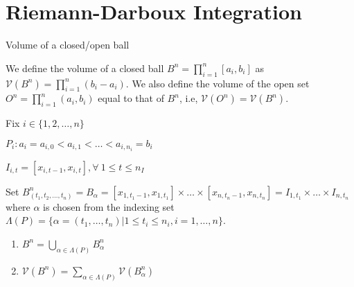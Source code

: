 \documentclass[a4paper]{article}
\begin{document}

\section{Riemann-Darboux Integration}



\begin{Def}{Volume of a closed/open ball}{}

We define the volume of a closed ball $B^n = \prod \limits_{i=1}^n [a_i, b_i]$ as $\mathcal{V}(B^n) = \prod \limits_{i=1}^n (b_i - a_i).$ We also define the volume of the open set $O^n = \prod \limits _{i=1}^n (a_i, b_i)$ equal to that of $B^n$, i.e, $\mathcal{V}(O^n) = \mathcal{V}(B^n)$.

\end{Def}

\begin{notnBox}

Fix $i \in \{1,2, \dots, n\}$ 

$P_i: a_i = a_{i,0} < a_{i,1} < \dots < a_{i,n_i} = b_i$

$I_{i,t} = [x_{i,t-1}, x_{i,t}], \forall \ 1 \leq t \leq n_I$

Set $B_{(t_1,t_2,\dots ,t_n)}^n = B_\alpha = [x_{1,t_1-1}, x_{1,t_1}] \times \dots \times [x_{n,t_n-1}, x_{n,t_n}] = I_{1,t_1} \times \dots \times I_{n,t_n}$ where $\alpha$ is chosen from the indexing set $\Lambda (P) = \{\alpha = (t_1,\dots ,t_n) | 1 \leq t_i \leq n_i, i=1, \dots , n\}$.


\end{notnBox}

\begin{noteBox}

    \begin{enumerate}
        \item $B^n = \bigcup \limits _{\alpha \in \Lambda (P)} B^n_\alpha$ 
        \item $\mathcal{V}(B^n) = \sum \limits _{\alpha \in \Lambda (P)} \mathcal{V}(B_\alpha ^n)$
    \end{enumerate}

\end{noteBox}
\end{document}
